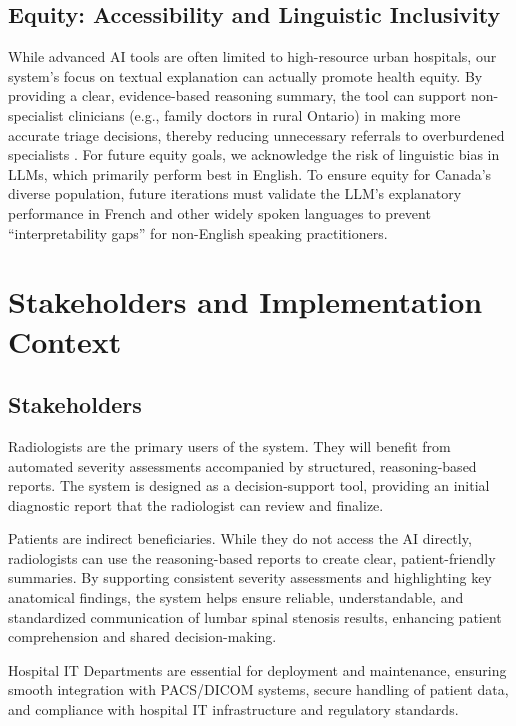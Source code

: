 \documentclass[12pt]{article}
\begin{document}
\subsection{Equity: Accessibility and Linguistic Inclusivity}
While advanced AI tools are often limited to high-resource urban hospitals, our system’s focus on textual explanation can actually promote health equity. By providing a clear, evidence-based reasoning summary, the tool can support non-specialist clinicians (e.g., family doctors in rural Ontario) in making more accurate triage decisions, thereby reducing unnecessary referrals to overburdened specialists \citep{Vergara2025}. 
For future equity goals, we acknowledge the risk of linguistic bias in LLMs, which primarily perform best in English. To ensure equity for Canada’s diverse population, future iterations must validate the LLM’s explanatory performance in French and other widely spoken languages to prevent “interpretability gaps” for non-English speaking practitioners.

\section{Stakeholders and Implementation Context}
\subsection{Stakeholders}
Radiologists are the primary users of the system. They will benefit from automated severity assessments accompanied by structured, reasoning-based reports. The system is designed as a decision-support tool, providing an initial diagnostic report that the radiologist can review and finalize.

Patients are indirect beneficiaries. While they do not access the AI directly, radiologists can use the reasoning-based reports to create clear, patient-friendly summaries. By supporting consistent severity assessments and highlighting key anatomical findings, the system helps ensure reliable, understandable, and standardized communication of lumbar spinal stenosis results, enhancing patient comprehension and shared decision-making.

Hospital IT Departments are essential for deployment and maintenance, ensuring smooth integration with PACS/DICOM systems, secure handling of patient data, and compliance with hospital IT infrastructure and regulatory standards.
\end{document}
